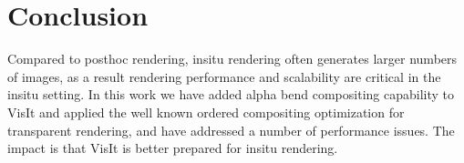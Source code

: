 \documentclass[a4paper,10pt]{report}
\begin{document}
\section{Conclusion}
Compared to posthoc rendering, insitu rendering often generates larger numbers of images, as a result rendering performance and scalability are critical in the insitu setting. In this work we have added alpha bend compositing capability to VisIt and applied the well known ordered compositing optimization for transparent rendering, and have addressed a number of performance issues. The impact is that VisIt is better prepared for insitu rendering.
\end{document}
